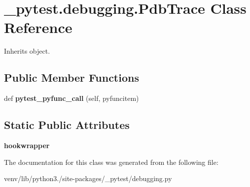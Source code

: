 \hypertarget{class__pytest_1_1debugging_1_1_pdb_trace}{}\section{\+\_\+pytest.\+debugging.\+Pdb\+Trace Class Reference}
\label{class__pytest_1_1debugging_1_1_pdb_trace}


Inherits object.

\subsection*{Public Member Functions}
\begin{DoxyCompactItemize}
\item 
\mbox{\label{class__pytest_1_1debugging_1_1_pdb_trace_a3caf06e787411d8794959ca22f12c442}} 
def {\bfseries pytest\+\_\+pyfunc\+\_\+call} (self, pyfuncitem)
\end{DoxyCompactItemize}
\subsection*{Static Public Attributes}
\begin{DoxyCompactItemize}
\item 
\mbox{\label{class__pytest_1_1debugging_1_1_pdb_trace_a4875778f1086e8b1f978040af875db10}} 
{\bfseries hookwrapper}
\end{DoxyCompactItemize}


The documentation for this class was generated from the following file\+:\begin{DoxyCompactItemize}
\item 
venv/lib/python3./site-\/packages/\+\_\+pytest/debugging.\+py\end{DoxyCompactItemize}
